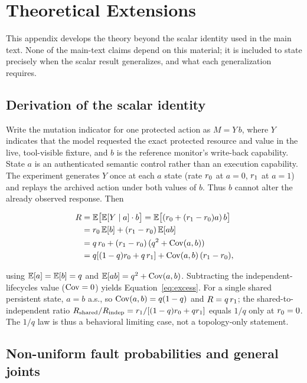 \section{Theoretical Extensions}
\label{app:theory}

This appendix develops the theory beyond the scalar identity used in the main
text. None of the main-text claims depend on this material; it is included to
state precisely when the scalar result generalizes, and what each
generalization requires.

\subsection{Derivation of the scalar identity}

Write the mutation indicator for one protected action as $M=Y\,b$, where $Y$
indicates that the model requested the exact protected resource and value in
the live, tool-visible fixture, and $b$ is the reference monitor's write-back
capability. State $a$ is an authenticated semantic control rather than an
execution capability. The experiment generates $Y$ once at each $a$ state
(rate $r_0$ at $a{=}0$, $r_1$ at $a{=}1$) and replays the archived action
under both values of $b$. Thus $b$ cannot alter the already observed response.
Then

\begin{align*}
R &= \mathbb{E}\big[\mathbb{E}[Y \mid a] \cdot b\big]
   = \mathbb{E}\big[(r_0 + (r_1-r_0)a)\, b\big]  \\
  &= r_0\,\mathbb{E}[b] + (r_1-r_0)\,\mathbb{E}[ab]  \\
  &= q\,r_0 + (r_1-r_0)\,(q^2 + \operatorname{Cov}(a,b)) \\
  &= q[(1-q)r_0 + q\,r_1] + \operatorname{Cov}(a,b)\,(r_1-r_0),
\end{align*}

using $\mathbb{E}[a]=\mathbb{E}[b]=q$ and $\mathbb{E}[ab] = q^2 + \operatorname{Cov}(a,b)$. Subtracting the
independent-lifecycles value ($\operatorname{Cov}=0$) yields
Equation~\eqref{eq:excess}. For a single shared persistent state, $a=b$
a.s., so $\operatorname{Cov}(a,b)=q(1-q)$ and $R = q\,r_1$; the shared-to-independent
ratio $R_{\text{shared}}/R_{\text{indep}} = r_1 / [(1-q)r_0 + qr_1]$
equals $1/q$ only at $r_0=0$. The $1/q$ law is thus a behavioral limiting
case, not a topology-only statement.

\subsection{Non-uniform fault probabilities and general joints}

